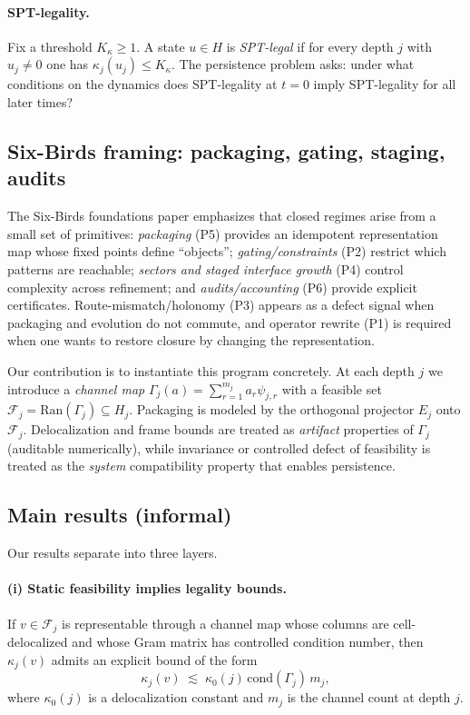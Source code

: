 \documentclass[11pt]{article}
\begin{document}
\paragraph{SPT-legality.}
Fix a threshold $K_\kappa\ge 1$.
A state $u\in H$ is \emph{SPT-legal} if for every depth $j$ with $u_j\neq 0$ one has $\kappa_j(u_j)\le K_\kappa$.
The persistence problem asks: under what conditions on the dynamics does SPT-legality at $t=0$ imply SPT-legality for all later times?

\subsection{Six-Birds framing: packaging, gating, staging, audits}

The Six-Birds foundations paper \cite{Tsiokos2026SixBirds} emphasizes that closed regimes arise from a small set of primitives:
\emph{packaging} (P5) provides an idempotent representation map whose fixed points define ``objects'';
\emph{gating/constraints} (P2) restrict which patterns are reachable;
\emph{sectors and staged interface growth} (P4) control complexity across refinement;
and \emph{audits/accounting} (P6) provide explicit certificates.
Route-mismatch/holonomy (P3) appears as a defect signal when packaging and evolution do not commute, and operator rewrite (P1) is required when one wants to restore closure by changing the representation.

Our contribution is to instantiate this program concretely.
At each depth $j$ we introduce a \emph{channel map} $\Gamma_j(a)=\sum_{r=1}^{m_j}a_r\psi_{j,r}$ with a feasible set $\mathcal F_j=\mathrm{Ran}(\Gamma_j)\subseteq H_j$.
Packaging is modeled by the orthogonal projector $E_j$ onto $\mathcal F_j$.
Delocalization and frame bounds are treated as \emph{artifact} properties of $\Gamma_j$ (auditable numerically), while invariance or controlled defect of feasibility is treated as the \emph{system} compatibility property that enables persistence.

\subsection{Main results (informal)}

Our results separate into three layers.

\paragraph{(i) Static feasibility implies legality bounds.}
If $v\in\mathcal F_j$ is representable through a channel map whose columns are cell-delocalized and whose Gram matrix has controlled condition number, then $\kappa_j(v)$ admits an explicit bound of the form
\[
\kappa_j(v)\;\lesssim\; \kappa_0(j)\,\mathrm{cond}(\Gamma_j)\,m_j,
\]
where $\kappa_0(j)$ is a delocalization constant and $m_j$ is the channel count at depth $j$.
\end{document}
